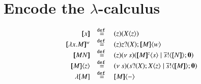 \section{Encode the $\lambda$-calculus}

\[
\begin{array}{rcl}
	\map{x} &\defeq& \abs{z} (\appl{X}{z})\\
	\map{\labs{x}{M}}^w &\defeq& \abs{z}{\binp{z}{X} \appl{\map{M}}{w}}\\
	\map{M N} &\defeq& \abs{z}{\newsp{s}{ \appl{\map{M}^z}{s} \Par \bout{\dual{s}}{\map{N}} \inact }}\\
	\appl{\map{M}}{z} &\defeq& \newsp{s}{ \binp{s}{X} \appl{X}{z} \Par \bout{\dual{s}}{\map{M}} \inact}\\
	\lambda[M] &\defeq& \appl{\map{M}}{-}
\end{array}
\]

